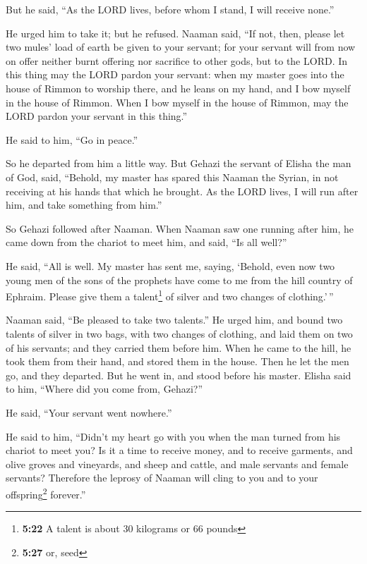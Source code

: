  But he said, ``As the LORD lives, before whom I stand, I
will receive none.''

He urged him to take it; but he refused.  Naaman said,
``If not, then, please let two mules' load of earth be given to your
servant; for your servant will from now on offer neither burnt offering
nor sacrifice to other gods, but to the LORD.  In this
thing may the LORD pardon your servant: when my master goes into the
house of Rimmon to worship there, and he leans on my hand, and I bow
myself in the house of Rimmon. When I bow myself in the house of Rimmon,
may the LORD pardon your servant in this thing.''

 He said to him, ``Go in peace.''

So he departed from him a little way.  But Gehazi the
servant of Elisha the man of God, said, ``Behold, my master has spared
this Naaman the Syrian, in not receiving at his hands that which he
brought. As the LORD lives, I will run after him, and take something
from him.''

 So Gehazi followed after Naaman. When Naaman saw one
running after him, he came down from the chariot to meet him, and said,
``Is all well?''

 He said, ``All is well. My master has sent me, saying,
`Behold, even now two young men of the sons of the prophets have come to
me from the hill country of Ephraim. Please give them a
talent\footnote{\textbf{5:22} A talent is about 30 kilograms or 66
  pounds} of silver and two changes of clothing.'\,''

 Naaman said, ``Be pleased to take two talents.'' He
urged him, and bound two talents of silver in two bags, with two changes
of clothing, and laid them on two of his servants; and they carried them
before him.  When he came to the hill, he took them from
their hand, and stored them in the house. Then he let the men go, and
they departed.  But he went in, and stood before his
master. Elisha said to him, ``Where did you come from, Gehazi?''

He said, ``Your servant went nowhere.''

 He said to him, ``Didn't my heart go with you when the
man turned from his chariot to meet you? Is it a time to receive money,
and to receive garments, and olive groves and vineyards, and sheep and
cattle, and male servants and female servants?  Therefore
the leprosy of Naaman will cling to you and to your offspring\footnote{\textbf{5:27}
  or, seed} forever.''


